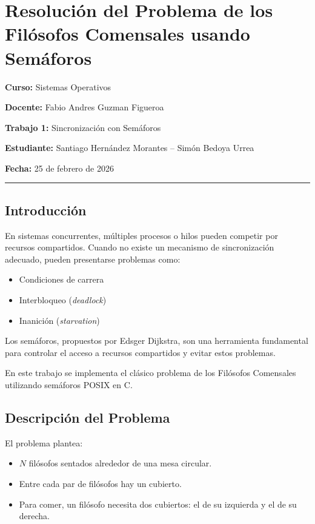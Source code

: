 \documentclass[12pt]{article}
\newcommand{\HRule}{\par\noindent\rule{0.5\linewidth}{0.5pt}\par}
\begin{document}
\section{Resolución del Problema de los Filósofos Comensales usando Semáforos}
\label{sec:filosofos-semaforos}

\textbf{Curso:} Sistemas Operativos

\textbf{Docente:} Fabio Andres Guzman Figueroa

\textbf{Trabajo 1:} Sincronización con Semáforos

\textbf{Estudiante:} Santiago Hernández Morantes -- Simón Bedoya Urrea

\textbf{Fecha:} 25 de febrero de 2026

\HRule

\newpage

\subsection{Introducción}
\label{subsec:introduccion}

En sistemas concurrentes, múltiples procesos o hilos pueden competir por recursos compartidos.
Cuando no existe un mecanismo de sincronización adecuado, pueden presentarse problemas como:

\begin{itemize}
  \item Condiciones de carrera
  \item Interbloqueo (\textit{deadlock})
  \item Inanición (\textit{starvation})
\end{itemize}

Los semáforos, propuestos por Edsger Dijkstra, son una herramienta fundamental para controlar el acceso a recursos compartidos y evitar estos problemas.

En este trabajo se implementa el clásico problema de los Filósofos Comensales utilizando semáforos POSIX en C.

\subsection{Descripción del Problema}
\label{subsec:descripcion}

El problema plantea:

\begin{itemize}
  \item $N$ filósofos sentados alrededor de una mesa circular.
  \item Entre cada par de filósofos hay un cubierto.
  \item Para comer, un filósofo necesita dos cubiertos: el de su izquierda y el de su derecha.
\end{itemize}
\end{document}
